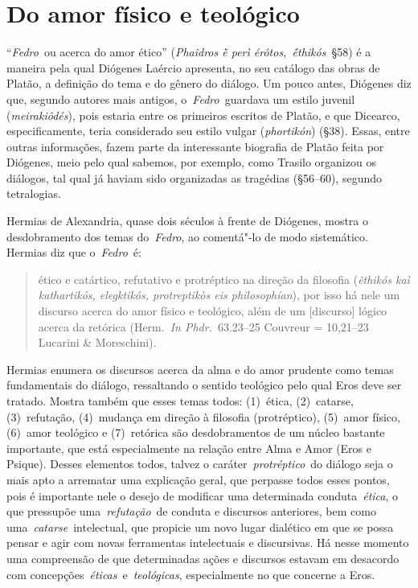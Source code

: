



 \section{Do amor físico e
teológico}
 

``\emph{Fedro}~ou acerca do amor ético'' (\emph{Phaîdros ḕ perì
érôtos,~ḗthikós}~§58) é a maneira pela qual Diógenes Laércio
apresenta, no seu catálogo das obras de Platão, a definição do tema e do
gênero do diálogo. Um pouco antes, Diógenes diz que, segundo autores mais
antigos, o~\emph{Fedro}~guardava um estilo juvenil (\emph{meirakiôdés}),
pois estaria entre os primeiros escritos de Platão, e que Dicearco,
especificamente, teria considerado seu estilo vulgar (\emph{phortikón})
(§38). Essas, entre outras informações, fazem parte da interessante
biografia de Platão feita por Diógenes, meio pelo qual sabemos, por
exemplo, como Trasilo organizou os diálogos, tal qual já haviam sido
organizadas as tragédias (§56--60), segundo tetralogias.

Hermias de Alexandria, quase dois séculos à frente de Diógenes, mostra o
desdobramento dos temas do~\emph{Fedro}, ao comentá"-lo de modo
sistemático. Hermias diz que o~\emph{Fedro}~é:

 

\begin{quote}
\redondo{[…]} ético e catártico, refutativo e protréptico na direção da
filosofia (\emph{êthikós kaì kathartikós, elegktikós, protreptikòs eis
philosophían}), por isso há nele um discurso acerca do amor físico e
teológico, além de um [discurso] lógico acerca da retórica
(Herm.~\emph{In Phdr.}~63.23--25 Couvreur = 10,21--23 Lucarini \&
Moreschini).
\end{quote}

 

Hermias enumera os discursos acerca da alma e do amor prudente como
temas fundamentais do diálogo, ressaltando o sentido teológico pelo qual
Eros deve ser tratado. Mostra também que esses temas todos: (1)~ética,
(2)~catarse, (3)~refutação, (4)~mudança em direção à filosofia
(protréptico), (5)~amor físico, (6)~amor teológico e (7)~retórica são
desdobramentos de um núcleo bastante importante, que está especialmente
na relação entre Alma e Amor (Eros e Psique). Desses elementos todos,
talvez o caráter~\emph{protréptico}~do diálogo seja o mais apto a
arrematar uma explicação geral, que perpasse todos esses pontos, pois é
importante nele o desejo de modificar uma determinada
conduta~\emph{ética}, o que pressupõe uma~\emph{refutação}~de conduta e
discursos anteriores, bem como uma~\emph{catarse}~intelectual, que
propicie um novo lugar dialético em que se possa pensar e agir com novas
ferramentas intelectuais e discursivas. Há nesse momento uma compreensão
de que determinadas ações e discursos estavam em desacordo com
concepções~\emph{éticas}~e~\emph{teológicas}, especialmente no que
concerne a Eros.

